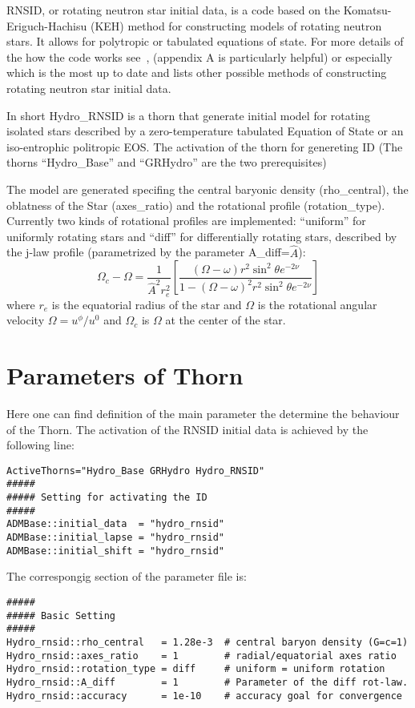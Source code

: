 RNSID, or rotating neutron star initial data, is a code based on the
Komatsu-Eriguch-Hachisu (KEH) method for constructing models of
rotating neutron stars. It allows for polytropic or tabulated
equations of state. For more details of the how the code works
see~\cite{rnsid1}, \cite{nsthesis} (appendix A is particularly
helpful) or especially \cite{nslivrev} which is the most up to date
and lists other possible methods of constructing rotating neutron star
initial data.

In short Hydro\_RNSID is a thorn that generate initial model for rotating 
isolated stars described by a zero-temperature tabulated Equation of State or
an iso-entrophic politropic EOS. The activation of the thorn for
genereting ID (The thorns ``Hydro\_Base'' and  ``GRHydro'' are the two prerequisites)

The model are generated specifing the central baryonic density
(rho\_central), the oblatness of the Star (axes\_ratio) and the
rotational profile (rotation\_type).  Currently two kinds of
rotational profiles are implemented: ``uniform'' for uniformly
rotating stars and ``diff'' for differentially rotating stars,
described by the j-law profile (parametrized by the parameter
A\_diff=$\hat{A}$):
\begin{equation}
  \Omega_c-\Omega = \frac{1}{\hat{A}^2 r_e^2}
  \left[ \frac{(\Omega-\omega) r^2 \sin^2 \theta e^{-2\nu}}{1-(\Omega-\omega)^2 r^2 \sin^2 \theta e^{-2\nu}}\right]
\end{equation}
where $r_e$ is the equatorial radius of the star and $\Omega$ is the
rotational angular velocity $\Omega=u^\phi/u^0$ and $\Omega_c$ is
$\Omega$ at the center of the star.


\section{Parameters of Thorn}
\label{sec:rnsid_par}

Here one can find definition of the main parameter the determine the
behaviour of the Thorn. The activation of the RNSID initial data
is achieved by the following line:
\begin{verbatim}
ActiveThorns="Hydro_Base GRHydro Hydro_RNSID"
#####
##### Setting for activating the ID 
#####
ADMBase::initial_data  = "hydro_rnsid"
ADMBase::initial_lapse = "hydro_rnsid"
ADMBase::initial_shift = "hydro_rnsid"
\end{verbatim}

The correspongig section of the parameter file is:
\begin{verbatim}
#####
##### Basic Setting
#####
Hydro_rnsid::rho_central   = 1.28e-3  # central baryon density (G=c=1) 
Hydro_rnsid::axes_ratio    = 1        # radial/equatorial axes ratio 
Hydro_rnsid::rotation_type = diff     # uniform = uniform rotation
Hydro_rnsid::A_diff        = 1        # Parameter of the diff rot-law.
Hydro_rnsid::accuracy      = 1e-10    # accuracy goal for convergence
\end{verbatim}



